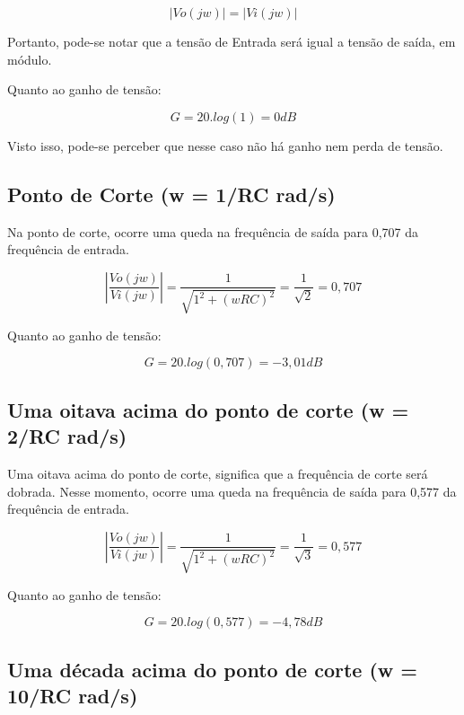 \documentclass[12pt]{article}
\begin{document}
\begin{equation}
|Vo(jw)|= |Vi(jw)|
\end{equation}

Portanto, pode-se notar que a tensão de Entrada será igual a tensão de saída, em módulo.

Quanto ao ganho de tensão:

\begin{equation}
G = 20.log(1) = 0dB
\end{equation}

Visto isso, pode-se perceber que nesse caso não há ganho nem perda de tensão.

\subsection{Ponto de Corte (w = 1/RC rad/s)}

Na ponto de corte, ocorre uma queda na frequência de saída para 0,707 da frequência de entrada.  

\begin{equation}
\left|\frac{Vo(jw)}{Vi(jw)} \right| = \frac{1}{\sqrt{1^2+(wRC)^2}} = \frac{1}{\sqrt{2}} = 0,707
\end{equation}

Quanto ao ganho de tensão:

\begin{equation}
G = 20.log(0,707) = -3,01dB
\end{equation}


\subsection{Uma oitava acima do ponto de corte (w = 2/RC rad/s)}
Uma oitava acima do ponto de corte, significa que a frequência de corte será dobrada. Nesse momento, ocorre uma queda na frequência de saída para 0,577 da frequência de entrada.  


\begin{equation}
\left|\frac{Vo(jw)}{Vi(jw)} \right| = \frac{1}{\sqrt{1^2+(wRC)^2}} = \frac{1}{\sqrt{3}} = 0,577
\end{equation}

Quanto ao ganho de tensão:

\begin{equation}
G = 20.log(0,577) = - 4,78dB
\end{equation}

\subsection{Uma década acima do ponto de corte (w = 10/RC rad/s)}
\end{document}
